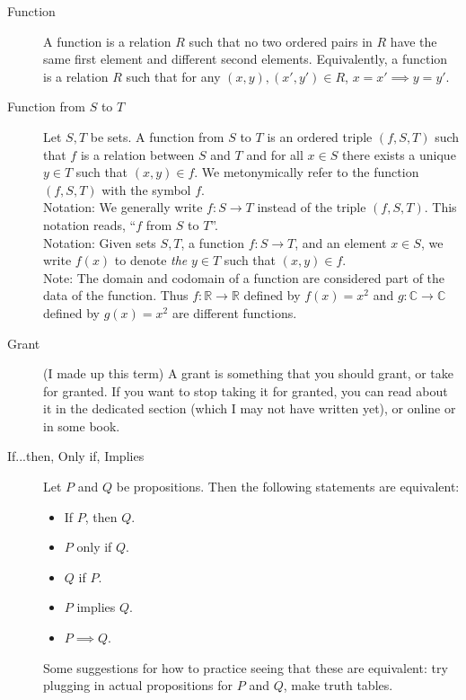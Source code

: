 \documentclass[12pt]{article}
\begin{document}
\begin{description}
  \item[Function] A function is a relation $R$ such that no two
    ordered pairs in $R$ have the same first element and different
    second elements.  Equivalently, a function is a relation $R$ such
    that for any $(x,y),(x',y')\in R$, $x=x'\implies y=y'$.

  \item[Function from $S$ to $T$] Let $S,T$ be sets.  A function from
    $S$ to $T$ is an ordered triple $(f,S,T)$ such that $f$ is a
    relation between $S$ and $T$ and for all $x\in S$ there exists a
    unique $y\in T$ such that $(x,y)\in f$. We metonymically refer to
    the function $(f,S,T)$ with the symbol $f$.\\
    
    Notation: We generally write $f:S\rightarrow T$ instead of the
    triple $(f,S,T)$.  This notation reads, ``$f$ from $S$ to
    $T$''. \\

    Notation: Given sets $S,T$, a function $f:S\rightarrow T$, and an
    element $x\in S$, we write $f(x)$ to denote \textit{the} $y\in T$
    such that $(x,y)\in f$. \\

    Note: The domain and codomain of a function are considered part of
    the data of the function.  Thus
    $f:\mathbb{R}\rightarrow\mathbb{R}$ defined by $f(x)=x^2$ and
    $g:\mathbb{C}\rightarrow\mathbb{C}$ defined by $g(x)=x^2$ are
    different functions.

  \item[Grant] (I made up this term) A grant is something that you
    should grant, or take for granted.  If you want to stop taking it
    for granted, you can read about it in the dedicated section (which
    I may not have written yet), or online or in some book.
    
  \item[If...then, Only if, Implies] Let $P$ and $Q$ be propositions.
    Then the following statements are equivalent:
    \begin{itemize}
    \item If $P$, then $Q$.
    \item $P$ only if $Q$.
    \item $Q$ if $P$.
    \item $P$ implies $Q$.
    \item $P\implies Q$.
    \end{itemize}
    Some suggestions for how to practice seeing that these are
    equivalent: try plugging in actual propositions for $P$ and $Q$,
    make truth tables.


\end{description}
\end{document}
